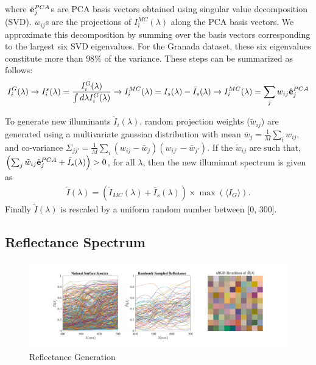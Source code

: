\documentclass{jov}
\begin{document}
where $\hat{{\bf e}}_j^{PCA}$s are PCA basis vectors obtained using 
singular value decomposition (SVD). $w_{ij}$s are the projections 
of $I_i^{MC}(\lambda)$ along the PCA basis vectors. We approximate 
this decomposition by summing over the basis vectors corresponding to
the largest six SVD eigenvalues. For the Granada dataset, these six 
eigenvalues constitute more than $98\%$ of the variance. These steps
can be summarized as follows:
\begin{align}
I^G_i(\lambda) \rightarrow I_i^s(\lambda) = \frac{I^G_i(\lambda)}{\int d\lambda I^G_i(\lambda)} \rightarrow I_i^{MC}(\lambda) = I_{s}(\lambda) - \bar{I}_{s}(\lambda) \rightarrow I_i^{MC}(\lambda) = \sum_j w_{ij}\hat{{\bf e}}_j^{PCA}
\end{align}

To generate new illuminants $\tilde{I}_i(\lambda)$, random 
projection weights ($\tilde{w}_{ij}$) are generated using a multivariate 
gaussian distribution with mean $\bar{w}_j = \frac{1}{M}\sum_i w_{ij}$, 
and co-variance $\Sigma_{jj'} = \frac{1}{M} \sum_i \left(w_{ij} -\bar{w}_j\right)\left(w_{ij'} -\bar{w}_{j'}\right) $. If the $\tilde{w}_{ij}$ are such that, $\left( \sum_j \tilde{w}_{ij} \hat{{\bf e}}_j^{PCA} +  \bar{I}_{s} (\lambda)\right) > 0$, for all $\lambda$, then the new illuminant spectrum is given as 
\begin{align}
\tilde{I}(\lambda) = \left( \tilde{I}_{MC}(\lambda) + \bar{I}_{s}(\lambda)\right) 
\times \max\left(\langle I_{G}\rangle\right) .
\end{align}
Finally $\tilde{I}(\lambda)$ is rescaled by a uniform random number between [0, 300].

\subsection{Reflectance Spectrum}
\begin{figure}
\centering
	\includegraphics[width=\textwidth]{../Figures/Figure13/Figure13.pdf}
    \caption{Reflectance Generation}
    \label{fig:reflectanceGeneration}
\end{figure}
\end{document}
